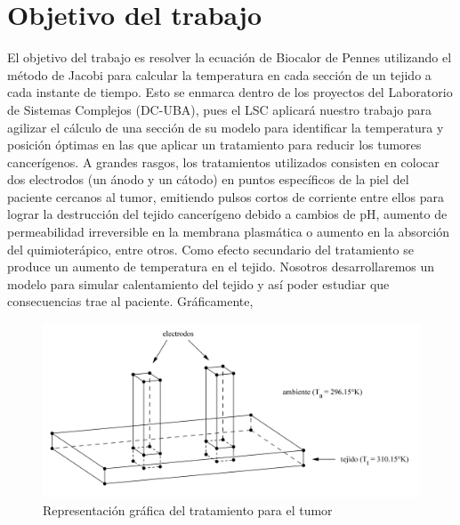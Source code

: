 \documentclass[a4paper]{article}
\begin{document}
\newtheorem{teo}{Teorema}[section]
\newtheorem{propo}{Proposici\'{o}n}[section]
\newtheorem{lema}{Lema}[section]
\newtheorem{coro}{Corolario}[section]
\newtheorem{defi}{Definici\'{o}n}[section]

\newpage
\setcounter{page}{1}
\pagestyle{plain}

\newpage


\newcommand{\Asig}{\ensuremath{\leftarrow}}
\newcommand{\AndY}{\ensuremath{\wedge}}
\newcommand{\Or}{\ensuremath{\vee}}
\newcommand{\Not}{\ensuremath{\neg}}
\newcommand{\NotEq}{\ensuremath{\neq}}
\newcommand{\MayorIg}{\ensuremath{\geq}}
\newcommand{\tabu}{\hspace*{0.7cm}}
\newcommand{\ctabu}{\hspace*{0.8cm}}
\newcommand{\htabu}{\hspace*{0.35cm}}
\newcommand{\moduloNombre}[1]{\textbf{#1}}

\section{Objetivo del trabajo}

El objetivo del trabajo es resolver la ecuación de Biocalor de Pennes 
utilizando el método de Jacobi para calcular la temperatura en cada 
sección de un tejido a cada instante de tiempo. Esto se enmarca dentro 
de los proyectos del Laboratorio de Sistemas Complejos (DC-UBA), pues 
el LSC aplicará nuestro trabajo para agilizar el cálculo de una sección 
de su modelo para identificar la temperatura y posición óptimas en las 
que aplicar un tratamiento para reducir los tumores cancerígenos. A 
grandes rasgos, los tratamientos utilizados consisten en colocar dos electrodos (un 
ánodo y un cátodo) en puntos específicos de la piel del paciente 
cercanos al tumor, emitiendo pulsos cortos de corriente entre 
ellos para lograr la destrucción del tejido cancerígeno 
debido a cambios de pH, aumento de permeabilidad irreversible en la 
membrana plasmática o aumento en la absorción del quimioterápico, 
entre otros. Como efecto secundario del tratamiento se produce un 
aumento de temperatura en el tejido. Nosotros desarrollaremos un 
modelo para simular calentamiento del tejido y así poder estudiar 
que consecuencias trae al paciente. Gráficamente,\\

\begin{figure}[!htbp]
  \centering
	\includegraphics[scale = 0.18]{tejido-anotado.png}
  \caption{Representación gráfica del tratamiento para el tumor}
\end{figure}
\end{document}
